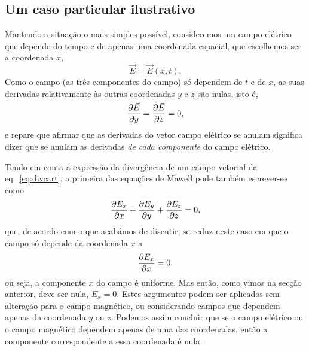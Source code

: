 \subsection*{Um caso particular ilustrativo}
Mantendo a situação o mais simples possível, consideremos um campo elétrico que
depende do tempo e de apenas uma coordenada espacial, que escolhemos ser a
coordenada $x$,
\begin{equation*}
  \vec E=\vec E(x,t).
\end{equation*}
Como o campo (as três componentes do campo) só dependem de $t$ e de $x$, as suas
derivadas relativamente às outras coordenadas $y$ e $z$ são nulas, isto é,
\begin{align*}
  \pd{\vec E}{y}=\pd{\vec E}{z}=0,
\end{align*}
e repare que afirmar que as derivadas do vetor campo elétrico se anulam
significa dizer que se anulam as derivadas \emph{de cada componente} do campo
elétrico.

Tendo em conta a expressão da divergência de um campo vetorial da
eq.~\eqref{eq:divcart}, a primeira das equações de Mawell pode também
escrever-se como
\begin{equation*}
  \frac{\partial E_x}{\partial x}+\frac{\partial E_y}{\partial y}+\frac{\partial E_z}{\partial z}=0,
\end{equation*}
que, de acordo com o que acabámos de discutir, se reduz neste caso em que o
campo só depende da coordenada $x$ a
\begin{equation*}
  \frac{\partial E_x}{\partial x}=0,
\end{equation*}
ou seja, a componente $x$ do campo é uniforme. Mas então, como vimos na secção
anterior, deve ser nula, $E_x=0$. Estes argumentos podem ser aplicados sem
alteração para o campo magnético, ou considerando campos que dependem apenas da
coordenada $y$ ou $z$. Podemos assim concluir que se o campo elétrico ou o campo
magnético dependem apenas de uma das coordenadas, então a componente
correspondente a essa coordenada é nula.

